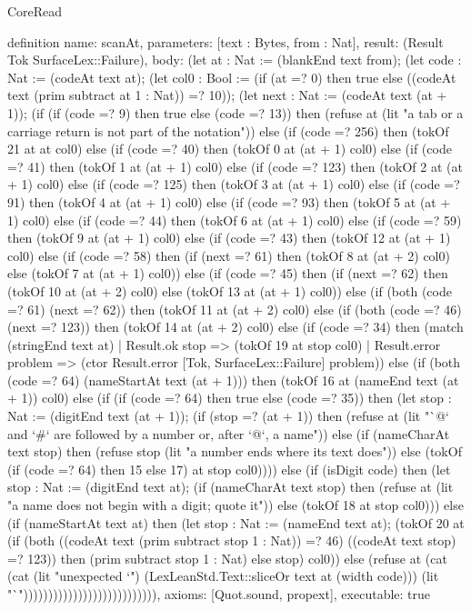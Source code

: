 \begin{lexlean}{CoreRead}
\begin{semanticmodule}
definition{
  name: scanAt,
  parameters: [text : Bytes, from : Nat],
  result: (Result Tok SurfaceLex::Failure),
  body: (let at : Nat := (blankEnd text from); (let code : Nat := (codeAt text at); (let col0 : Bool := (if (at =? 0) then true else ((codeAt text (prim subtract at 1 : Nat)) =? 10)); (let next : Nat := (codeAt text (at + 1)); (if (if (code =? 9) then true else (code =? 13)) then (refuse at (lit "a tab or a carriage return is not part of the notation")) else (if (code =? 256) then (tokOf 21 at at col0) else (if (code =? 40) then (tokOf 0 at (at + 1) col0) else (if (code =? 41) then (tokOf 1 at (at + 1) col0) else (if (code =? 123) then (tokOf 2 at (at + 1) col0) else (if (code =? 125) then (tokOf 3 at (at + 1) col0) else (if (code =? 91) then (tokOf 4 at (at + 1) col0) else (if (code =? 93) then (tokOf 5 at (at + 1) col0) else (if (code =? 44) then (tokOf 6 at (at + 1) col0) else (if (code =? 59) then (tokOf 9 at (at + 1) col0) else (if (code =? 43) then (tokOf 12 at (at + 1) col0) else (if (code =? 58) then (if (next =? 61) then (tokOf 8 at (at + 2) col0) else (tokOf 7 at (at + 1) col0)) else (if (code =? 45) then (if (next =? 62) then (tokOf 10 at (at + 2) col0) else (tokOf 13 at (at + 1) col0)) else (if (both (code =? 61) (next =? 62)) then (tokOf 11 at (at + 2) col0) else (if (both (code =? 46) (next =? 123)) then (tokOf 14 at (at + 2) col0) else (if (code =? 34) then (match (stringEnd text at)
    | Result.ok stop => (tokOf 19 at stop col0)
    | Result.error problem => (ctor Result.error [Tok, SurfaceLex::Failure] problem)) else (if (both (code =? 64) (nameStartAt text (at + 1))) then (tokOf 16 at (nameEnd text (at + 1)) col0) else (if (if (code =? 64) then true else (code =? 35)) then (let stop : Nat := (digitEnd text (at + 1)); (if (stop =? (at + 1)) then (refuse at (lit "`@` and `#` are followed by a number or, after `@`, a name")) else (if (nameCharAt text stop) then (refuse stop (lit "a number ends where its text does")) else (tokOf (if (code =? 64) then 15 else 17) at stop col0)))) else (if (isDigit code) then (let stop : Nat := (digitEnd text at); (if (nameCharAt text stop) then (refuse at (lit "a name does not begin with a digit; quote it")) else (tokOf 18 at stop col0))) else (if (nameStartAt text at) then (let stop : Nat := (nameEnd text at); (tokOf 20 at (if (both ((codeAt text (prim subtract stop 1 : Nat)) =? 46) ((codeAt text stop) =? 123)) then (prim subtract stop 1 : Nat) else stop) col0)) else (refuse at (cat (cat (lit "unexpected `") (LexLeanStd.Text::sliceOr text at (width code))) (lit "`"))))))))))))))))))))))))))),
  axioms: [Quot.sound, propext],
  executable: true
}


\end{semanticmodule}
\end{lexlean}
